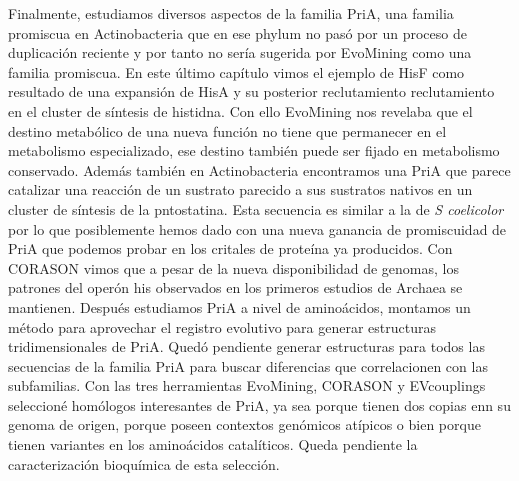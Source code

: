 \documentclass[12pt,twoside]{reedthesis}
\begin{document}
  Finalmente, estudiamos diversos aspectos de la familia PriA, una familia
  promiscua en Actinobacteria que en ese phylum no pasó por un proceso de
  duplicación reciente y por tanto no sería sugerida por EvoMining como
  una familia promiscua. En este último capítulo vimos el ejemplo de HisF
  como resultado de una expansión de HisA y su posterior reclutamiento
  reclutamiento en el cluster de síntesis de histidna. Con ello EvoMining
  nos revelaba que el destino metabólico de una nueva función no tiene que
  permanecer en el metabolismo especializado, ese destino también puede
  ser fijado en metabolismo conservado. Además también en Actinobacteria
  encontramos una PriA que parece catalizar una reacción de un sustrato
  parecido a sus sustratos nativos en un cluster de síntesis de la
  pntostatina. Esta secuencia es similar a la de \emph{S coelicolor} por
  lo que posiblemente hemos dado con una nueva ganancia de promiscuidad de
  PriA que podemos probar en los critales de proteína ya producidos. Con
  CORASON vimos que a pesar de la nueva disponibilidad de genomas, los
  patrones del operón his observados en los primeros estudios de Archaea
  se mantienen. Después estudiamos PriA a nivel de aminoácidos, montamos
  un método para aprovechar el registro evolutivo para generar estructuras
  tridimensionales de PriA. Quedó pendiente generar estructuras para todos
  las secuencias de la familia PriA para buscar diferencias que
  correlacionen con las subfamilias. Con las tres herramientas EvoMining,
  CORASON y EVcouplings seleccioné homólogos interesantes de PriA, ya sea
  porque tienen dos copias enn su genoma de origen, porque poseen
  contextos genómicos atípicos o bien porque tienen variantes en los
  aminoácidos catalíticos. Queda pendiente la caracterización bioquímica
  de esta selección.
  
\end{document}
